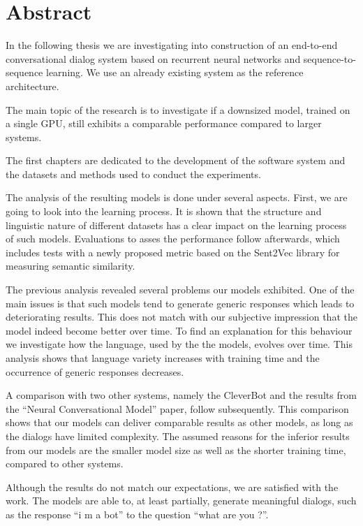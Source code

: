 \chapter*{Abstract}
In the following thesis we are investigating into construction of an end-to-end conversational dialog system based on recurrent neural networks and sequence-to-sequence learning. We use an already existing system as the reference architecture. 

The main topic of the research is to investigate if a downsized model, trained on a single GPU, still exhibits a comparable performance compared to larger systems.

The first chapters are dedicated to the development of the software system and the datasets and methods used to conduct the experiments.

The analysis of the resulting models is done under several aspects. First, we are going to look into the learning process. It is shown that the structure and linguistic nature of different datasets has a clear impact on the learning process of such models. Evaluations to asses the performance follow afterwards, which includes tests with a newly proposed metric based on the Sent2Vec library for measuring semantic similarity.

The previous analysis revealed several problems our models exhibited. One of the main issues is that such models tend to generate generic responses which leads to deteriorating results. This does not match with our subjective impression that the model indeed become better over time. To find an explanation for this behaviour we investigate how the language, used by the the models, evolves over time. This analysis shows that language variety increases with training time and the occurrence of generic responses decreases.

A comparison with two other systems, namely the CleverBot and the results from the ``Neural Conversational Model'' paper, follow subsequently. This comparison shows that our models can deliver comparable results as other models, as long as the dialogs have limited complexity. The assumed reasons for the inferior results from our models are the smaller model size as well as the shorter training time, compared to other systems.

Although the results do not match our expectations, we are satisfied with the work. The models are able to, at least partially, generate meaningful dialogs, such as the response ``i m a bot'' to the question ``what are you ?''.

